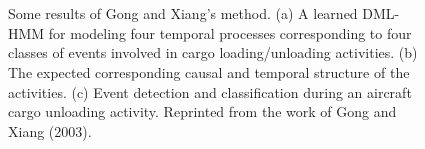 \begin{figure}[t]
  \centering
  \\
  \\
  \caption[Some results of Gong and Xiang's method]{Some results of Gong and Xiang's method. 
  (a) A learned DML-HMM for modeling four temporal processes corresponding to four classes of events involved in cargo loading/unloading activities. 
  (b) The expected corresponding causal and temporal structure of the activities. 
  (c) Event detection and classification during an aircraft cargo unloading activity. Reprinted from the work of Gong and Xiang (2003).}
  \label{fig:gong-results}
\end{figure}

